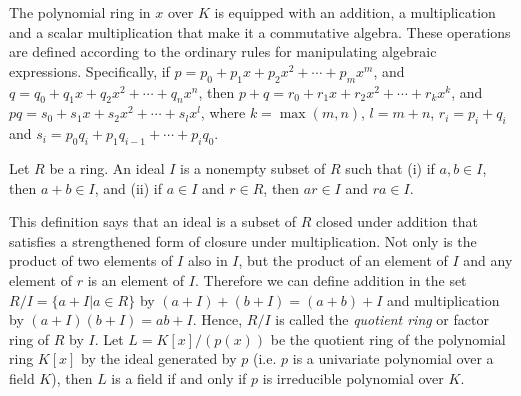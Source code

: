 The polynomial ring in $x$ over $K$ is equipped with an addition, a multiplication and a scalar multiplication that make it a commutative algebra. These operations are defined according to the ordinary rules for manipulating algebraic expressions. Specifically, if $p=p_{0}+p_{1}x+p_{2}x^{2}+\cdots +p_{m}x^{m}$, and $q=q_{0}+q_{1}x+q_{2}x^{2}+\cdots +q_{n}x^{n}$, then $p+q=r_{0}+r_{1}x+r_{2}x^{2}+\cdots +r_{k}x^{k}$, and $pq=s_{0}+s_{1}x+s_{2}x^{2}+\cdots +s_{l}x^{l}$, where $k = \max(m, n)$, $l = m + n$, $r_{i}=p_{i}+q_{i}$ and $s_{i}=p_{0}q_{i}+p_{1}q_{i-1}+\cdots +p_{i}q_{0}$.









\begin{definition}
\normalfont
Let $R$ be a ring. An ideal $I$ is a nonempty subset of $R$ such that (i) if
$a,b\in I$, then $a+b\in I$, and (ii) if $a\in I$ and $r\in R$, then $ar\in I$
and $ra\in I$.
\end{definition}
This definition says that an ideal is a subset of $R$ closed under addition that satisfies a strengthened form of closure under multiplication. Not only is the product of two elements of $I$ also in $I$, but the product of an element of $I$ and any element of $r$ is an element of $I$. Therefore we can define addition in the set $R/I = \{ a + I | a \in R\}$ by $(a + I)+(b + I)=(a + b) + I$ and multiplication by $(a + I)(b + I) = ab + I$. Hence, $R/I$ is called the \textit{quotient ring} or factor ring of $R$ by $I$. Let $L=K[x]/ ( p(x) )$ be the quotient ring of the polynomial ring $K[x]$ by the ideal generated by $p$ (i.e. $p$ is a univariate polynomial over a field $K$), then $L$ is a field if and only if $p$ is irreducible polynomial over $K$.




